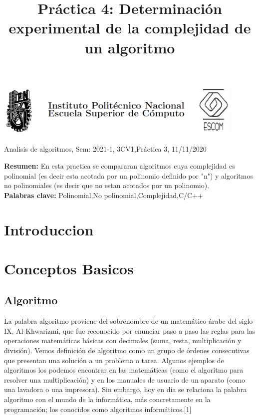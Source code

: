 \documentclass[spanish]{article}
\title {Práctica 4: Determinación experimental de la complejidad de un algoritmo}
\begin{document}
	\centerline{\includegraphics[width=450px,height=100px]{header}}
	\centerline{Analisis de algoritmos, Sem: 2021-1, 3CV1,Práctica  3, 11/11/2020}
	\centerline{}
	\bigskip
	\justify
	\textbf{Resumen:}	
	En esta practica se compararan algoritmos cuya complejidad es polinomial (es decir esta acotada por un polinomio definido por "n") y algoritmos no polinomiales (es decir que no estan acotados por un polinomio).\\
	\textbf{Palabras clave:}
	Polinomial,No polinomial,Complejidad,C/C++
	\section{Introduccion}
	
	\section{Conceptos Basicos}
	\subsection{Algoritmo}
	La palabra algoritmo proviene del sobrenombre de un matemático árabe del siglo IX, Al-Khwarizmi, que fue reconocido por enunciar paso a paso las reglas para las operaciones matemáticas básicas con decimales (suma, resta, multiplicación y división).	
	Vemos definición de algoritmo como un grupo de órdenes consecutivas que presentan una solución a un problema o tarea. Algunos ejemplos de algoritmos los podemos encontrar en las matemáticas (como el algoritmo para resolver una multiplicación) y en los manuales de usuario de un aparato (como una lavadora o una impresora).	
	Sin embargo, hoy en día se relaciona la palabra algoritmo con el mundo de la informática, más concretamente en la programación; los conocidos como algoritmos informáticos.[1]
\end{document}
